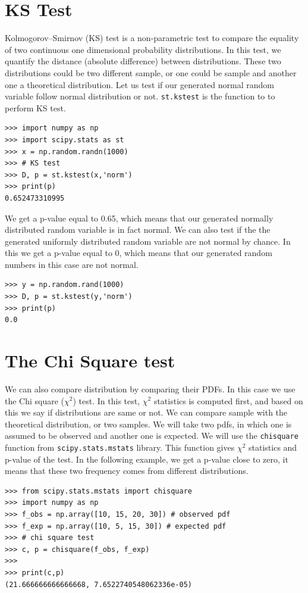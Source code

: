 \documentclass[10pt]{book}
\begin{document}
{\section{KS Test}
Kolmogorov–Smirnov (KS) test is a non-parametric test to compare the equality of two continuous one dimensional probability distributions. In this test, we quantify the distance (absolute difference) between distributions. These two distributions could be two different sample, or one could be sample and another one a theoretical distribution. Let us test if our generated normal random variable follow normal distribution or not. \verb"st.kstest" is the function to to perform KS test. 
\beforeverb \begin{verbatim}
>>> import numpy as np
>>> import scipy.stats as st
>>> x = np.random.randn(1000) 
>>> # KS test
>>> D, p = st.kstest(x,'norm')
>>> print(p)
0.652473310995
\end{verbatim} \afterverb
We get a p-value equal to 0.65, which means that our generated normally distributed random variable is in fact normal. We can also test if the the generated uniformly distributed random variable are not normal by chance. In this we get a p-value equal to 0, which means that our generated random numbers in this case are not normal. 
\beforeverb \begin{verbatim}
>>> y = np.random.rand(1000) 
>>> D, p = st.kstest(y,'norm')
>>> print(p)
0.0
\end{verbatim} \afterverb

\section{The Chi Square test}
We can also compare distribution by comparing their PDFs. In this case we use the Chi square ($\chi^2$) test. In this test, $\chi^2$ statistics is computed first, and based on this we say if distributions are same or not. We can compare sample with the theoretical distribution, or two samples. We will take two pdfs, in which one is assumed to be observed and another one is expected. We will use the \verb"chisquare" function from \verb"scipy.stats.mstats" library. This function gives  $\chi^2$ statistics and p-value of the test. In the following example, we get a p-value close to zero, it means that these two frequency comes from different distributions.
\beforeverb \begin{verbatim}
>>> from scipy.stats.mstats import chisquare
>>> import numpy as np
>>> f_obs = np.array([10, 15, 20, 30]) # observed pdf
>>> f_exp = np.array([10, 5, 15, 30]) # expected pdf
>>> # chi square test
>>> c, p = chisquare(f_obs, f_exp)
>>> 
>>> print(c,p)
(21.666666666666668, 7.6522740548062336e-05)
\end{verbatim} \afterverb

}
\end{document}
